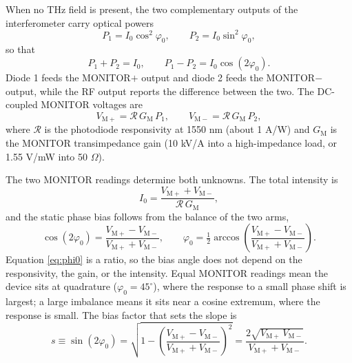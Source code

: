 \documentclass[11pt]{article}
\newcommand{\Iz}{I_{0}}
\newcommand{\phz}{\varphi_{0}}
\newcommand{\Vp}{V_{\mathrm{M+}}}
\newcommand{\Vm}{V_{\mathrm{M-}}}
\newcommand{\Resp}{\mathcal{R}}
\begin{document}
When no THz field is present, the two complementary outputs of the interferometer carry
optical powers
\begin{equation}
  P_{1} = \Iz \cos^{2}\!\phz, \qquad P_{2} = \Iz \sin^{2}\!\phz,
\end{equation}
so that
\begin{equation}
  P_{1}+P_{2} = \Iz, \qquad P_{1}-P_{2} = \Iz \cos(2\phz).
\end{equation}
Diode 1 feeds the MONITOR$+$ output and diode 2 feeds the MONITOR$-$ output, while the
RF output reports the difference between the two. The DC-coupled MONITOR voltages are
\begin{equation}
  \Vp = \Resp\,G_{\mathrm{M}}\,P_{1}, \qquad \Vm = \Resp\,G_{\mathrm{M}}\,P_{2},
\end{equation}
where $\Resp$ is the photodiode responsivity at 1550 nm (about 1 A/W) and
$G_{\mathrm{M}}$ is the MONITOR transimpedance gain (10 kV/A into a high-impedance load,
or 1.55 V/mW into 50 $\Omega$).

The two MONITOR readings determine both unknowns. The total intensity is
\begin{equation}
  \Iz = \frac{\Vp + \Vm}{\Resp\,G_{\mathrm{M}}}, \label{eq:I0}
\end{equation}
and the static phase bias follows from the balance of the two arms,
\begin{equation}
  \cos(2\phz) = \frac{\Vp - \Vm}{\Vp + \Vm}, \qquad
  \phz = \tfrac{1}{2}\arccos\!\left(\frac{\Vp - \Vm}{\Vp + \Vm}\right). \label{eq:phi0}
\end{equation}
Equation \eqref{eq:phi0} is a ratio, so the bias angle does not depend on the
responsivity, the gain, or the intensity. Equal MONITOR readings mean the device sits
at quadrature ($\phz = 45^\circ$), where the response to a small phase shift is largest;
a large imbalance means it sits near a cosine extremum, where the response is small. The
bias factor that sets the slope is
\begin{equation}
  s \equiv \sin(2\phz) = \sqrt{1-\left(\frac{\Vp-\Vm}{\Vp+\Vm}\right)^{2}}
    = \frac{2\sqrt{\Vp\,\Vm}}{\Vp+\Vm}. \label{eq:s}
\end{equation}
\end{document}
